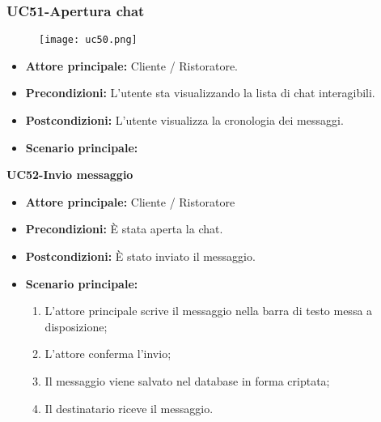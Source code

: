 \subsubsection{UC51-Apertura chat}
\begin{figure}[h] \texttt{[image: uc50.png]} \end{figure}
\begin{itemize}
\item \textbf{Attore principale:} Cliente / Ristoratore.
\item \textbf{Precondizioni:} L'utente sta visualizzando la lista di chat interagibili.
\item \textbf{Postcondizioni:} L'utente visualizza la cronologia dei messaggi.
\item \textbf{Scenario principale:}
\end{itemize}

\textbf{UC52-Invio messaggio}
\begin{itemize}
\item \textbf{Attore principale:} Cliente / Ristoratore
\item \textbf{Precondizioni:} È stata aperta la chat.
\item \textbf{Postcondizioni:} È stato inviato il messaggio.
\item \textbf{Scenario principale:}
\begin{enumerate}
    \item L'attore principale scrive il messaggio nella barra di testo messa a disposizione;
    \item L'attore conferma l'invio;
    \item Il messaggio viene salvato nel database in forma criptata;
    \item Il destinatario riceve il messaggio.
\end{enumerate}
\end{itemize}
